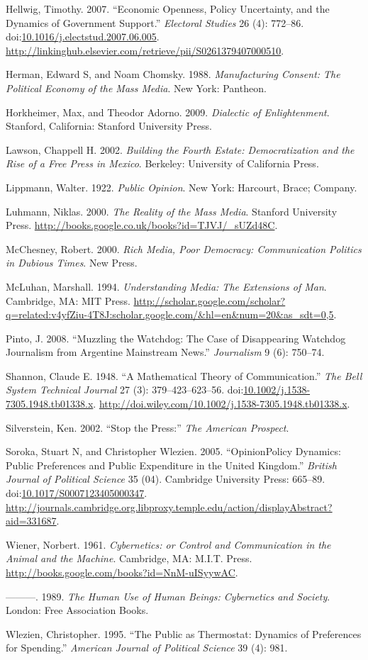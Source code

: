 \documentclass[12pt,book]{article}
\begin{document}
Hellwig, Timothy. 2007. ``Economic Openness, Policy Uncertainty, and the
Dynamics of Government Support.'' \emph{Electoral Studies} 26 (4):
772--86.
doi:\href{http://dx.doi.org/10.1016/j.electstud.2007.06.005}{10.1016/j.electstud.2007.06.005}.
\url{http://linkinghub.elsevier.com/retrieve/pii/S0261379407000510}.

Herman, Edward S, and Noam Chomsky. 1988. \emph{Manufacturing Consent:
The Political Economy of the Mass Media}. New York: Pantheon.

Horkheimer, Max, and Theodor Adorno. 2009. \emph{Dialectic of
Enlightenment}. Stanford, California: Stanford University Press.

Lawson, Chappell H. 2002. \emph{Building the Fourth Estate:
Democratization and the Rise of a Free Press in Mexico}. Berkeley:
University of California Press.

Lippmann, Walter. 1922. \emph{Public Opinion}. New York: Harcourt,
Brace; Company.

Luhmann, Niklas. 2000. \emph{The Reality of the Mass Media}. Stanford
University Press.
\url{http://books.google.co.uk/books?id=TJVJ/_sUZd48C}.

McChesney, Robert. 2000. \emph{Rich Media, Poor Democracy: Communication
Politics in Dubious Times}. New Press.

McLuhan, Marshall. 1994. \emph{Understanding Media: The Extensions of
Man}. Cambridge, MA: MIT Press.
\url{http://scholar.google.com/scholar?q=related:v4yfZiu-4T8J:scholar.google.com/\&hl=en\&num=20\&as_sdt=0,5}.

Pinto, J. 2008. ``Muzzling the Watchdog: The Case of Disappearing
Watchdog Journalism from Argentine Mainstream News.'' \emph{Journalism}
9 (6): 750--74.

Shannon, Claude E. 1948. ``A Mathematical Theory of Communication.''
\emph{The Bell System Technical Journal} 27 (3): 379--423--623--56.
doi:\href{http://dx.doi.org/10.1002/j.1538-7305.1948.tb01338.x}{10.1002/j.1538-7305.1948.tb01338.x}.
\url{http://doi.wiley.com/10.1002/j.1538-7305.1948.tb01338.x}.

Silverstein, Ken. 2002. ``Stop the Press:'' \emph{The American
Prospect}.

Soroka, Stuart N, and Christopher Wlezien. 2005. ``OpinionPolicy
Dynamics: Public Preferences and Public Expenditure in the United
Kingdom.'' \emph{British Journal of Political Science} 35 (04).
Cambridge University Press: 665--89.
doi:\href{http://dx.doi.org/10.1017/S0007123405000347}{10.1017/S0007123405000347}.
\url{http://journals.cambridge.org.libproxy.temple.edu/action/displayAbstract?aid=331687}.

Wiener, Norbert. 1961. \emph{Cybernetics: or Control and Communication
in the Animal and the Machine}. Cambridge, MA: M.I.T. Press.
\url{http://books.google.com/books?id=NnM-uISyywAC}.

---------. 1989. \emph{The Human Use of Human Beings: Cybernetics and
Society}. London: Free Association Books.

Wlezien, Christopher. 1995. ``The Public as Thermostat: Dynamics of
Preferences for Spending.'' \emph{American Journal of Political Science}
39 (4): 981.
\end{document}
